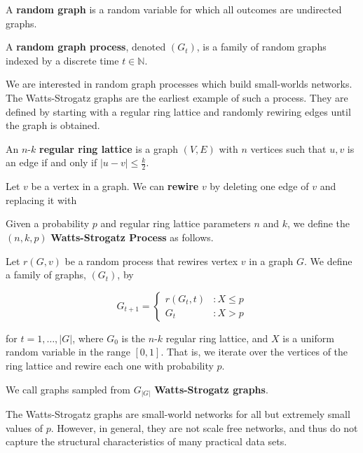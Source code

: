 \begin{definition}
  A \textbf{random graph} is a random variable for which all outcomes are
  undirected graphs.

  A \textbf{random graph process}, denoted $(G_t)$, is a family of random graphs
  indexed by a discrete time $t \in \mathbb{N}$.
\end{definition}

We are interested in random graph processes which build small-worlds networks.
The Watts-Strogatz graphs are the earliest example of such a process. They are
defined by starting with a regular ring lattice and randomly rewiring edges
until the graph is obtained.

\begin{definition}
  An $n$-$k$ \textbf{regular ring lattice} is a graph $(V, E)$ with $n$ vertices
  such that $u,v$ is an edge if and only if $|u-v| \leq \frac{k}{2}$.
\end{definition}

\begin{definition}
  Let $v$ be a vertex in a graph. We can \textbf{rewire} $v$ by deleting one
  edge of $v$ and replacing it with 
\end{definition}

\begin{definition}
  Given a probability $p$ and regular ring lattice parameters $n$ and $k$, we
  define the $(n,k,p)$ \textbf{Watts-Strogatz Process} as follows.

  Let $r(G,v)$ be a random process that rewires vertex $v$ in a graph $G$. We
  define a family of graphs, $(G_t)$, by

  \[
    G_{t+1} = \left\{
      \begin{array}{lc}
        r(G_t,t) &: X \leq p \\
        G_t &: X > p
      \end{array}
    \right.
  \]

  for $t = 1,\dots, |G|$, where $G_0$ is the $n$-$k$ regular ring lattice, and
  $X$ is a uniform random variable in the range $[0,1]$. That is, we iterate
  over the vertices of the ring lattice and rewire each one with probability
  $p$.

  We call graphs sampled from $G_{|G|}$ \textbf{Watts-Strogatz graphs}.
\end{definition}

The Watts-Strogatz graphs are small-world networks for all but extremely small
values of $p$. However, in general, they are not scale free networks, and thus
do not capture the structural characteristics of many practical data sets.

